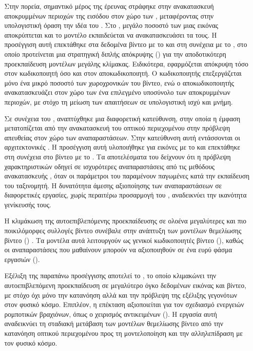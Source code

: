 Στην πορεία, σημαντικό μέρος της έρευνας στράφηκε στην ανακατασκευή
αποκρυμμένων περιοχών της εισόδου στον χώρο των , μεταφέροντας
στην υπολογιστική όραση την ιδέα του . Στο 
\cite{he2022masked}, μεγάλο ποσοστό των  μιας εικόνας
αποκρύπτεται και το μοντέλο εκπαιδεύεται να ανακατασκευάσει τα 
τους. Η προσέγγιση αυτή επεκτάθηκε στα δεδομένα βίντεο με το
 \cite{tong2022videomae} και στη συνέχεια με το
 \cite{wang2023videomaev2}, στο οποίο προτείνεται μια
στρατηγική διπλής απόκρυψης () για την αποδοτικότερη
προεκπαίδευση μοντέλων μεγάλης κλίμακας. Ειδικότερα, εφαρμόζεται απόκρυψη
τόσο στον κωδικοποιητή όσο και στον αποκωδικοποιητή. Ο κωδικοποιητής
επεξεργάζεται μόνο ένα μικρό ποσοστό των χωροχρονικών  του
βίντεο, ενώ ο αποκωδικοποιητής ανακατασκευάζει στον χώρο των 
ένα επιλεγμένο υποσύνολο των αποκρυμμένων περιοχών, με στόχο τη μείωση των
απαιτήσεων σε υπολογιστική ισχύ και μνήμη.

Σε συνέχεια του , αναπτύχθηκε μια διαφορετική κατεύθυνση, στην
οποία η έμφαση μετατοπίζεται από την ανακατασκευή του οπτικού περιεχομένου
στην πρόβλεψη απευθείας στον χώρο των αναπαραστάσεων. Στην κατεύθυνση αυτή
εντάσσονται οι αρχιτεκτονικές . Η προσέγγιση αυτή υλοποιήθηκε για εικόνες με το 
\cite{mahmoud2023i-jepa} και επεκτάθηκε στη συνέχεια στο βίντεο με το
 \cite{adrien2023v-jepa}. Τα αποτελέσματα του 
δείχνουν ότι η πρόβλεψη χαρακτηριστικών οδηγεί σε ισχυρότερες
αναπαραστάσεις από τις μεθόδους ανακατασκευής , όταν οι παράμετροι του  παραμένουν παγωμένες κατά την
εκπαίδευση του ταξινομητή. Η
δυνατότητα άμεσης αξιοποίησης των αναπαραστάσεων σε διαφορετικές εργασίες,
χωρίς περαιτέρω προσαρμογή του , αναδεικνύει την ικανότητα
γενίκευσής τους.

Η κλιμάκωση της αυτοεπιβλεπόμενης προεκπαίδευσης σε ολοένα μεγαλύτερες
και πιο ποικιλόμορφες συλλογές βίντεο συνέβαλε στην ανάπτυξη των μοντέλων
θεμελίωσης βίντεο ()
\cite{bommasani2021opportunities}. Τα μοντέλα αυτά λειτουργούν ως γενικοί
κωδικοποιητές βίντεο (), καθώς οι αναπαραστάσεις που μαθαίνουν
μπορούν να αξιοποιηθούν σε ένα ευρύ φάσμα εργασιών ().

Εξέλιξη της παραπάνω προσέγγισης αποτελεί το , το οποίο
κλιμακώνει την αυτοεπιβλεπόμενη προεκπαίδευση σε μεγαλύτερο όγκο
δεδομένων εικόνας και βίντεο, με στόχο όχι μόνο την κατανόηση αλλά και την
πρόβλεψη της εξέλιξης γεγονότων στον φυσικό κόσμο. Επιπλέον, η επέκταση
\cite{assran2025vjepa2} αξιοποιείται για τον σχεδιασμό ενεργειών ρομποτικών
βραχιόνων, όπως ο χειρισμός αντικειμένων (). Η
εργασία αυτή αναδεικνύει τη σταδιακή μετάβαση των μοντέλων θεμελίωσης
βίντεο από την κατανόηση οπτικού περιεχομένου προς τη μοντελοποίηση και
την αλληλεπίδραση με τον φυσικό κόσμο.



